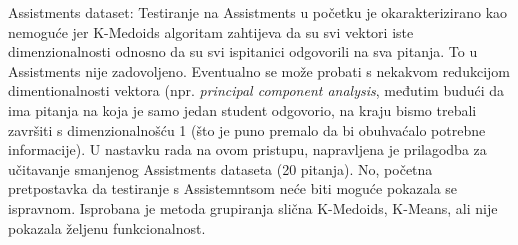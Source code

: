 Assistments dataset:\newline
Testiranje na Assistments u početku je okarakterizirano kao nemoguće jer K-Medoids algoritam zahtijeva da su svi vektori iste dimenzionalnosti odnosno da su svi ispitanici odgovorili na sva pitanja. To u Assistments nije zadovoljeno. Eventualno se može probati s nekakvom redukcijom dimentionalnosti vektora (npr. \textit{principal component analysis}, međutim budući da ima pitanja na koja je samo jedan student odgovorio, na kraju bismo trebali završiti s dimenzionalnošću 1 (što je puno premalo da bi obuhvaćalo potrebne informacije).\newline
U nastavku rada na ovom pristupu, napravljena je prilagodba za učitavanje smanjenog Assistments dataseta (20 pitanja). No, početna pretpostavka da testiranje s Assistemntsom neće biti moguće pokazala se ispravnom. Isprobana je metoda grupiranja slična K-Medoids, K-Means, ali nije pokazala željenu funkcionalnost.

